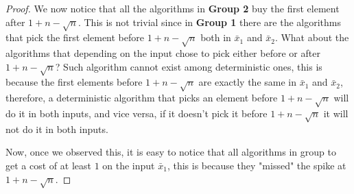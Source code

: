\documentclass[11pt]{article}
\begin{document}
\begin{enumerate}
\begin{proof}
    We now notice that all the algorithms in \textbf{Group 2} buy the first element after $1 + n - \sqrt{n}$. This is not trivial since in \textbf{Group 1} there are the algorithms that pick the first element before $1 + n - \sqrt{n}$ both in $\bar x_1$ and $\bar x_2$. What about the algorithms that depending on the input chose to pick either before or after $1 + n - \sqrt{n}$? Such algorithm cannot exist among deterministic ones, this is because the first elements before $1 + n - \sqrt{n}$ are exactly the same in $\bar x_1$ and $\bar x_2$, therefore, a deterministic algorithm that picks an element before $1 + n - \sqrt{n}$ will do it in both inputs, and vice versa, if it doesn't pick it before $1 + n - \sqrt{n}$ it will not do it in both inputs.

    Now, once we observed this, it is easy to notice that all algorithms in group to get a cost of at least $1$ on the input $\bar x_1$, this is because they "missed" the spike at $1 + n - \sqrt{n}$. 
    

\end{proof}
\end{enumerate}
\end{document}
